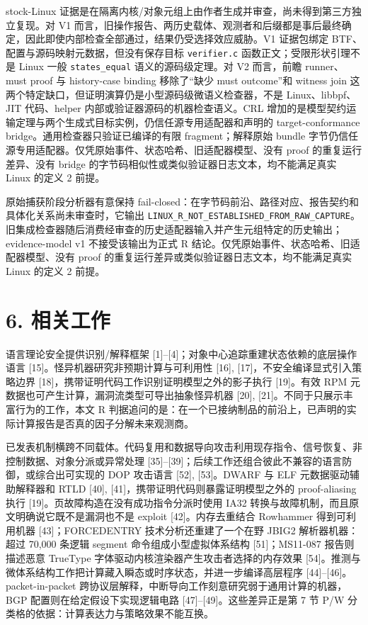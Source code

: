 \documentclass[
  11pt,
  a4paper,
]{ctexart}
\begin{document}
stock-Linux
证据是在隔离内核/对象元组上由作者生成并审查，尚未得到第三方独立复现。对
V1
而言，旧操作报告、两历史载体、观测者和后缀都是事后最终确定，因此即使内部检查全部通过，结果仍受选择效应威胁。V1
证据包绑定 BTF、配置与源码映射元数据，但没有保存目标 \texttt{verifier.c}
函数正文；受限形状引理不是 Linux 一般 \texttt{states\_equal}
语义的源码级定理。对 V2 而言，前瞻 runner、must proof 与 history-case
binding 移除了``缺少 must outcome''和 witness join
这两个特定缺口，但证明演算仍是小型源码级微语义检查器，不是
Linux、libbpf、JIT 代码、helper 内部或验证器源码的机器检查语义。CRL
增加的是模型契约运输定理与两个生成式目标实例，仍信任源专用适配器和声明的
target-conformance bridge。通用检查器只验证已编译的有限
fragment；解释原始 bundle
字节仍信任源专用适配器。仅凭原始事件、状态哈希、旧适配器模型、没有 proof
的重复运行差异、没有 bridge
的字节码相似性或类似验证器日志文本，均不能满足真实 Linux 的定义 2 前提。

原始捕获阶段分析器有意保持
fail-closed：在字节码前沿、路径对应、报告契约和具体化关系尚未审查时，它输出
\texttt{LINUX\_R\_NOT\_ESTABLISHED\_FROM\_RAW\_CAPTURE}。旧集成检查器随后消费经审查的历史适配器输入并产生元组特定的历史输出；evidence-model
v1 不接受该输出为正式 R 结论。仅凭原始事件、状态哈希、旧适配器模型、没有
proof 的重复运行差异或类似验证器日志文本，均不能满足真实 Linux 的定义 2
前提。

\hypertarget{6-ux76f8ux5173ux5de5ux4f5c}{%
\section{6. 相关工作}\label{6-ux76f8ux5173ux5de5ux4f5c}}

语言理论安全提供识别/解释框架
{[}1{]}--{[}4{]}；对象中心追踪重建状态依赖的底层操作语言
{[}15{]}。怪异机器研究非预期计算与可利用性 {[}16{]},
{[}17{]}，不安全编译显式引入策略边界
{[}18{]}，携带证明代码工作识别证明模型之外的影子执行 {[}19{]}。有效 RPM
元数据也可产生计算，漏洞流类型可导出抽象怪异机器 {[}20{]},
{[}21{]}。不同于只展示丰富行为的工作，本文 R
判据追问的是：在一个已接纳制品的前沿上，已声明的实际计算报告是否真的因子分解未来观测商。

已发表机制横跨不同载体。代码复用和数据导向攻击利用现存指令、信号恢复、非控制数据、对象分派或异常处理
{[}35{]}--{[}39{]}；后续工作还组合彼此不兼容的语言防御，或综合出可实现的 DOP
攻击语言 {[}52{]}, {[}53{]}。DWARF 与 ELF 元数据驱动辅助解释器和 RTLD
{[}40{]}, {[}41{]}，携带证明代码则暴露证明模型之外的 proof-aliasing 执行
{[}19{]}。页故障构造在没有成功指令分派时使用 IA32
转换与故障机制，而且原文明确说它既不是漏洞也不是 exploit
{[}42{]}。内存去重结合 Rowhammer 得到可利用机器
{[}43{]}；FORCEDENTRY 技术分析还重建了一个在野 JBIG2
解析器机器：超过 70,000 条逻辑 segment 命令组成小型虚拟体系结构
{[}51{]}；MS11-087 报告则描述恶意 TrueType
字体驱动内核渲染器产生攻击者选择的内存效果
{[}54{]}。推测与微体系结构工作把计算藏入瞬态或时序状态，并进一步编译高层程序
{[}44{]}--{[}46{]}。packet-in-packet
跨协议层解释，中断导向工作刻意研究弱于通用计算的机器，BGP
配置则在给定假设下实现逻辑电路 {[}47{]}--{[}49{]}。这些差异正是第 7 节
P/W 分类格的依据：计算表达力与策略效果不能互换。
\end{document}
